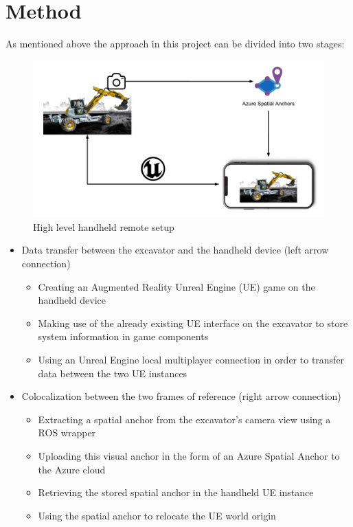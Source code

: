 \chapter{Method}\label{ch:method}

As mentioned above the approach in this project can be divided into two stages:

\begin{figure}[ht]
    \centering
    \includegraphics[scale = 0.32]{images/method/method.png}
    \caption{High level handheld remote setup}
    \label{fig:method}
\end{figure}

\begin{itemize}
    \item Data transfer between the excavator and the handheld device (left arrow connection)
    \begin{itemize}
        \item Creating an Augmented Reality Unreal Engine (UE) game on the handheld device
        \item Making use of the already existing UE interface on the excavator to store system information in game components 
        \item Using an Unreal Engine local multiplayer connection in order to transfer data between the two UE instances
    \end{itemize}
    \item Colocalization between the two frames of reference (right arrow connection) 
    \begin{itemize}
        \item Extracting a spatial anchor from the excavator's camera view using a ROS wrapper 
        \item Uploading this visual anchor in the form of an Azure Spatial Anchor to the Azure cloud
        \item Retrieving the stored spatial anchor in the handheld UE instance 
        \item Using the spatial anchor to relocate the UE world origin
    \end{itemize}
\end{itemize}




